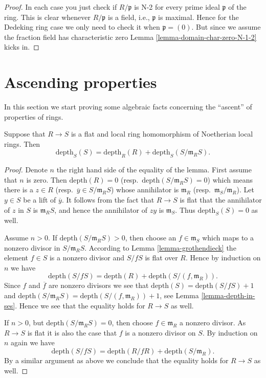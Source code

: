 \begin{proof}
In each case you just check if $R/\mathfrak p$ is N-2 for every
prime ideal $\mathfrak p$ of the ring. This is clear whenever
$R/\mathfrak p$ is a field, i.e., $\mathfrak p$ is maximal.
Hence for the Dedeking ring case we only need to check it when
$\mathfrak p = (0)$. But since we assume the fraction field has
characteristic zero Lemma \ref{lemma-domain-char-zero-N-1-2} kicks in.
\end{proof}








\section{Ascending properties}
\label{section-ascending-properties}

\noindent
In this section we start proving some algebraic facts concerning the
``ascent'' of properties of rings.

\begin{lemma}
\label{lemma-apply-grothendieck}
Suppose that $R \to S$ is a flat and local ring homomorphism of Noetherian
local rings. Then
$$
\text{depth}_S(S) = \text{depth}_R(R) + \text{depth}_S(S/\mathfrak m_RS).
$$
\end{lemma}

\begin{proof}
Denote $n$ the right hand side of the equality of the lemma.
First assume that $n$ is zero.
Then $\text{depth}(R) = 0$ (resp.\ $\text{depth}(S/\mathfrak m_RS) = 0$)
which means there is a $z \in R$ (resp.\ $\overline{y} \in S/\mathfrak m_RS$)
whose annihilator is $\mathfrak m_R$ (resp.\ $\mathfrak m_S/\mathfrak m_R$).
Let $y \in S$ be a lift of $\overline{y}$.
It follows from the fact that $R \to S$ is flat that the annihilator
of $z$ in $S$ is $\mathfrak m_RS$, and hence the annihilator
of $zy$ is $\mathfrak m_S$. Thus $\text{depth}_S(S) = 0$ as well.

\medskip\noindent
Assume $n > 0$.
If $\text{depth}(S/\mathfrak m_RS) > 0$, then choose
an $f \in \mathfrak m_S$ which maps to a nonzero divisor
in $S/\mathfrak m_RS$. According to Lemma \ref{lemma-grothendieck}
the element $f \in S$ is a nonzero divisor
and $S/fS$ is flat over $R$. Hence by induction on $n$ we have
$$
\text{depth}(S/fS) = \text{depth}(R) + \text{depth}(S/(f, \mathfrak m_R)).
$$
Since $f$ and $\overline{f}$ are nonzero divisors we see that
$\text{depth}(S) = \text{depth}(S/fS) + 1$ and
$\text{depth}(S/\mathfrak m_RS) = \text{depth}(S/(f, \mathfrak m_R)) + 1$,
see Lemma \ref{lemma-depth-in-ses}. Hence we see that the equality holds for
$R \to S$ as well.

\medskip\noindent
If $n > 0$, but $\text{depth}(S/\mathfrak m_RS) = 0$, then choose
$f \in \mathfrak m_R$ a nonzero divisor. As $R \to S$ is flat it is
also the case that $f$ is a nonzero divisor on $S$. By induction on $n$
again we have
$$
\text{depth}(S/fS) = \text{depth}(R/fR) + \text{depth}(S/\mathfrak m_R).
$$
By a similar argument as above we conclude that the equality
holds for $R \to S$ as well.
\end{proof}

